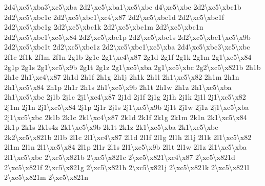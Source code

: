 {2d4\textbackslash{}xc5\textbackslash{}xba3\textbackslash{}xc5\textbackslash{}xba 2d2\textbackslash{}xc5\textbackslash{}xba1\textbackslash{}xc5\textbackslash{}xbc d4\textbackslash{}xc5\textbackslash{}xbc 2d2\textbackslash{}xc5\textbackslash{}xbc1b 2d2\textbackslash{}xc5\textbackslash{}xbc1c 2d2\textbackslash{}xc5\textbackslash{}xbc1\textbackslash{}xc4\textbackslash{}x87 2d2\textbackslash{}xc5\textbackslash{}xbc1d 2d2\textbackslash{}xc5\textbackslash{}xbc1f 2d2\textbackslash{}xc5\textbackslash{}xbc1g 2d2\textbackslash{}xc5\textbackslash{}xbc1k 2d2\textbackslash{}xc5\textbackslash{}xbc1m 2d2\textbackslash{}xc5\textbackslash{}xbc1n 2d2\textbackslash{}xc5\textbackslash{}xbc1\textbackslash{}xc5\textbackslash{}x84 2d2\textbackslash{}xc5\textbackslash{}xbc1p 2d2\textbackslash{}xc5\textbackslash{}xbc1s 2d2\textbackslash{}xc5\textbackslash{}xbc1\textbackslash{}xc5\textbackslash{}x9b 2d2\textbackslash{}xc5\textbackslash{}xbc1t 2d2\textbackslash{}xc5\textbackslash{}xbc1z 2d2\textbackslash{}xc5\textbackslash{}xbc1\textbackslash{}xc5\textbackslash{}xba 2d4\textbackslash{}xc5\textbackslash{}xbc3\textbackslash{}xc5\textbackslash{}xbc 2f1c 2f1k 2f1m 2f1n 2g1b 2g1c 2g1\textbackslash{}xc4\textbackslash{}x87 2g1d 2g1f 2g1k 2g1m 2g1\textbackslash{}xc5\textbackslash{}x84 2g1p 2g1s 2g1\textbackslash{}xc5\textbackslash{}x9b 2g1t 2g1z 2g1\textbackslash{}xc5\textbackslash{}xba 2g1\textbackslash{}xc5\textbackslash{}xbc 2g2\textbackslash{}xc5\textbackslash{}x821b 2h1b 2h1c 2h1\textbackslash{}xc4\textbackslash{}x87 2h1d 2h1f 2h1g 2h1j 2h1k 2h1l 2h1\textbackslash{}xc5\textbackslash{}x82 2h1m 2h1n 2h1\textbackslash{}xc5\textbackslash{}x84 2h1p 2h1r 2h1s 2h1\textbackslash{}xc5\textbackslash{}x9b 2h1t 2h1w 2h1z 2h1\textbackslash{}xc5\textbackslash{}xba 2h1\textbackslash{}xc5\textbackslash{}xbc 2j1b 2j1c 2j1\textbackslash{}xc4\textbackslash{}x87 2j1d 2j1f 2j1g 2j1h 2j1k 2j1l 2j1\textbackslash{}xc5\textbackslash{}x82 2j1m 2j1n 2j1\textbackslash{}xc5\textbackslash{}x84 2j1p 2j1r 2j1s 2j1\textbackslash{}xc5\textbackslash{}x9b 2j1t 2j1w 2j1z 2j1\textbackslash{}xc5\textbackslash{}xba 2j1\textbackslash{}xc5\textbackslash{}xbc 2k1b 2k1c 2k1\textbackslash{}xc4\textbackslash{}x87 2k1d 2k1f 2k1g 2k1m 2k1n 2k1\textbackslash{}xc5\textbackslash{}x84 2k1p 2k1s 2k1s4z 2k1\textbackslash{}xc5\textbackslash{}x9b 2k1t 2k1z 2k1\textbackslash{}xc5\textbackslash{}xba 2k1\textbackslash{}xc5\textbackslash{}xbc 2k2\textbackslash{}xc5\textbackslash{}x821b 2l1b 2l1c 2l1\textbackslash{}xc4\textbackslash{}x87 2l1d 2l1f 2l1g 2l1h 2l1j 2l1k 2l1\textbackslash{}xc5\textbackslash{}x82 2l1m 2l1n 2l1\textbackslash{}xc5\textbackslash{}x84 2l1p 2l1r 2l1s 2l1\textbackslash{}xc5\textbackslash{}x9b 2l1t 2l1w 2l1z 2l1\textbackslash{}xc5\textbackslash{}xba 2l1\textbackslash{}xc5\textbackslash{}xbc 2\textbackslash{}xc5\textbackslash{}x821b 2\textbackslash{}xc5\textbackslash{}x821c 2\textbackslash{}xc5\textbackslash{}x821\textbackslash{}xc4\textbackslash{}x87 2\textbackslash{}xc5\textbackslash{}x821d 2\textbackslash{}xc5\textbackslash{}x821f 2\textbackslash{}xc5\textbackslash{}x821g 2\textbackslash{}xc5\textbackslash{}x821h 2\textbackslash{}xc5\textbackslash{}x821j 2\textbackslash{}xc5\textbackslash{}x821k 2\textbackslash{}xc5\textbackslash{}x821l 2\textbackslash{}xc5\textbackslash{}x821m 2\textbackslash{}xc5\textbackslash{}x821n }
